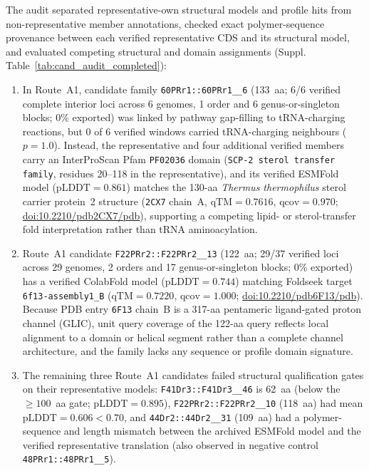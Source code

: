 The audit separated representative-own structural models and profile hits from non-representative member annotations, checked exact polymer-sequence provenance between each verified representative CDS and its structural model, and evaluated competing structural and domain assignments (Suppl. Table~\ref{tab:cand_audit_completed}):
\begin{enumerate}
\item In Route~A1, candidate family \texttt{60PRr1::\allowbreak 60PRr1\_\_6} (133~aa; 6/6 verified complete interior loci across 6 genomes, 1 order and 6 genus-or-singleton blocks; 0\% exported) was linked by pathway gap-filling to tRNA-charging reactions, but 0 of 6 verified windows carried tRNA-charging neighbours ($p=1.0$). Instead, the representative and four additional verified members carry an InterProScan Pfam \texttt{PF02036} domain (\texttt{SCP-2 sterol transfer family}, residues 20--118 in the representative), and its verified ESMFold model ($\mathrm{pLDDT}=0.861$) matches the 130-aa \emph{Thermus thermophilus} sterol carrier protein~2 structure (\texttt{2CX7} chain~A, $\mathrm{qTM}=0.7616$, $\mathrm{qcov}=0.970$; \href{https://doi.org/10.2210/pdb2CX7/pdb}{doi:10.2210/pdb2CX7/pdb}), supporting a competing lipid- or sterol-transfer fold interpretation rather than tRNA aminoacylation.
\item Route~A1 candidate \texttt{F22PRr2::\allowbreak F22PRr2\_\_13} (122~aa; 29/37 verified loci across 29 genomes, 2 orders and 17 genus-or-singleton blocks; 0\% exported) has a verified ColabFold model ($\mathrm{pLDDT}=0.744$) matching Foldseek target \texttt{6f13-assembly1\_B} ($\mathrm{qTM}=0.7220$, $\mathrm{qcov}=1.000$; \href{https://doi.org/10.2210/pdb6F13/pdb}{doi:10.2210/pdb6F13/pdb}). Because PDB entry \texttt{6F13} chain~B is a 317-aa pentameric ligand-gated proton channel (GLIC), unit query coverage of the 122-aa query reflects local alignment to a domain or helical segment rather than a complete channel architecture, and the family lacks any sequence or profile domain signature.
\item The remaining three Route~A1 candidates failed structural qualification gates on their representative models: \texttt{F41Dr3::\allowbreak F41Dr3\_\_46} is 62~aa (below the $\geq 100$~aa gate; $\mathrm{pLDDT}=0.895$), \texttt{F22PRr2::\allowbreak F22PRr2\_\_10} (118~aa) had mean $\mathrm{pLDDT}=0.606<0.70$, and \texttt{44Dr2::\allowbreak 44Dr2\_\_31} (109~aa) had a polymer-sequence and length mismatch between the archived ESMFold model and the verified representative translation (also observed in negative control \texttt{48PRr1::\allowbreak 48PRr1\_\_5}).

\end{enumerate}
